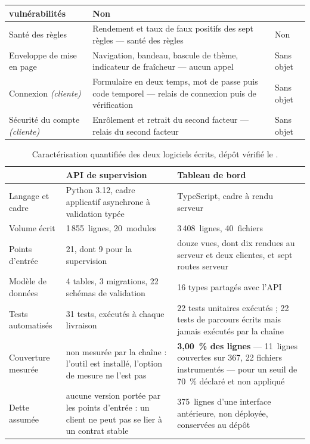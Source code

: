 {\begin{longtable}{|P{2.60cm}|P{10.55cm}|P{1.65cm}|}
vulnérabilités & Non \\ \hline
Santé des règles & Rendement et taux de faux positifs des sept règles --- santé des règles & Non \\ \hline
Enveloppe de mise en page & Navigation, bandeau, bascule de thème, indicateur de fraîcheur ---
aucun appel & Sans objet \\ \hline
Connexion \textit{(cliente)} & Formulaire en deux temps, mot de passe puis code temporel ---
relais de connexion puis de vérification & Sans objet \\ \hline
Sécurité du compte \textit{(cliente)} & Enrôlement et retrait du second facteur --- relais du
second facteur & Sans objet \\
\hline
\end{longtable}
}

\begin{table}[htbp]
\caption[Caractérisation quantifiée des deux logiciels écrits]{Caractérisation quantifiée des deux
logiciels écrits, dépôt vérifié le \dateref.}
\label{tab:logiciel-ecrit}
\centering
\scriptsize
\setlength{\tabcolsep}{3.5pt}
\renewcommand{\arraystretch}{1.10}
\begin{tabular}{|P{3.05cm}|P{6.10cm}|P{6.05cm}|}
\hline
 & \textbf{API de supervision} & \textbf{Tableau de bord} \\
\hline
Langage et cadre & Python 3.12, cadre applicatif asynchrone à validation typée &
TypeScript, cadre à rendu serveur \\ \hline
Volume écrit & 1\,855~lignes, 20~modules & 3\,408~lignes, 40~fichiers \\ \hline
Points d'entrée & 21, dont 9 pour la supervision & douze vues, dont dix rendues au serveur et
deux clientes, et sept routes serveur \\ \hline
Modèle de données & 4 tables, 3 migrations, 22 schémas de validation & 16 types partagés avec
l'API \\ \hline
Tests automatisés & 31 tests, exécutés à chaque livraison & 22 tests unitaires exécutés ;
22 tests de parcours écrits mais jamais exécutés par la chaîne \\ \hline
Couverture mesurée & non mesurée par la chaîne : l'outil est installé, l'option de mesure ne
l'est pas & \textbf{3,00~\% des lignes} --- 11~lignes couvertes sur 367, 22 fichiers
instrumentés --- pour un seuil de 70~\% déclaré et non appliqué \\ \hline
Dette assumée & aucune version portée par les points d'entrée : un client ne peut pas se lier
à un contrat stable & 375~lignes d'une interface antérieure, non déployée, conservées au
dépôt \\
\hline
\end{tabular}
\end{table}
